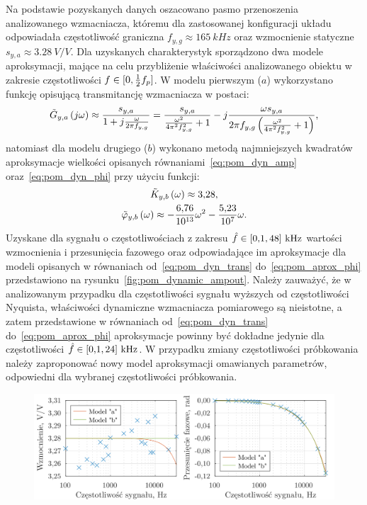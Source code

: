 Na podstawie pozyskanych danych oszacowano pasmo przenoszenia analizowanego wzmacniacza, któremu dla zastosowanej konfiguracji układu odpowiadała częstotliwość graniczna $f_{y,g} \approx \qty{165}{kHz}$ oraz wzmocnienie statyczne $s_{y,a} \approx \qty{3.28}{V \per V}$. Dla uzyskanych charakterystyk sporządzono dwa modele aproksymacji, mające na celu przybliżenie właściwości analizowanego obiektu w zakresie częstotliwości $f \in \interval{0}{\frac{1}{2}f_{p}}$. W modelu pierwszym ($a$) wykorzystano funkcję opisującą transmitancję wzmacniacza w postaci:
\begin{gather}
\tilde{G}_{y,a} \left(j\omega\right) \approx \frac{s_{y,a}}{1 + j \frac{\omega}{2 \pi f_{y,g}}} = \frac{s_{y,a}}{\frac{\omega^{2}}{4 \pi^{2} f_{y,g}^{2}} + 1} - j \frac{\omega s_{y,a}}{2 \pi f_{y,g} \left( \frac{\omega^{2}}{4 \pi^{2} f_{y,g}^{2}} + 1 \right) } \label{eq:pom_dyn_trans},
\end{gather}
natomiast dla modelu drugiego ($b$) wykonano metodą najmniejszych kwadratów aproksymacje wielkości opisanych równaniami~\eqref{eq:pom_dyn_amp} oraz~\eqref{eq:pom_dyn_phi} przy użyciu funkcji:
\begin{gather}
\tilde{K}_{y,b} \left(\omega\right) \approx \num{3.28} \label{eq:pom_aprox_amp}, \\
\tilde{\varphi}_{y,b} \left(\omega\right) \approx -\frac{\num{6.76}}{\num{e13}} \omega^{2} - \frac{\num{5.23}}{\num{e07}} \omega \label{eq:pom_aprox_phi}.
\end{gather}
Uzyskane dla sygnału o częstotliwościach z zakresu $\hat{f} \in \interval{\num{0.1}}{\num{48}}~\unit{kHz}$ wartości wzmocnienia i przesunięcia fazowego oraz odpowiadające im aproksymacje dla modeli opisanych w równaniach od~\eqref{eq:pom_dyn_trans} do~\eqref{eq:pom_aprox_phi} przedstawiono na rysunku~\ref{fig:pom_dynamic_ampout}. Należy zauważyć, że w analizowanym przypadku dla częstotliwości sygnału wyższych od częstotliwości Nyquista, właściwości dynamiczne wzmacniacza pomiarowego są nieistotne, a zatem przedstawione w równaniach od~\eqref{eq:pom_dyn_trans} do~\eqref{eq:pom_aprox_phi} aproksymacje powinny być dokładne jedynie dla częstotliwości $\hat{f} \in \interval{\num{0.1}}{\num{24}}~\unit{kHz}$. W przypadku zmiany częstotliwości próbkowania należy zaproponować nowy model aproksymacji omawianych parametrów, odpowiedni dla wybranej częstotliwości próbkowania.

\begin{figure}[htb!]
\begin{center}
\includegraphics{obrazki/dynamic_ampout}
\end{center}
\end{figure}

